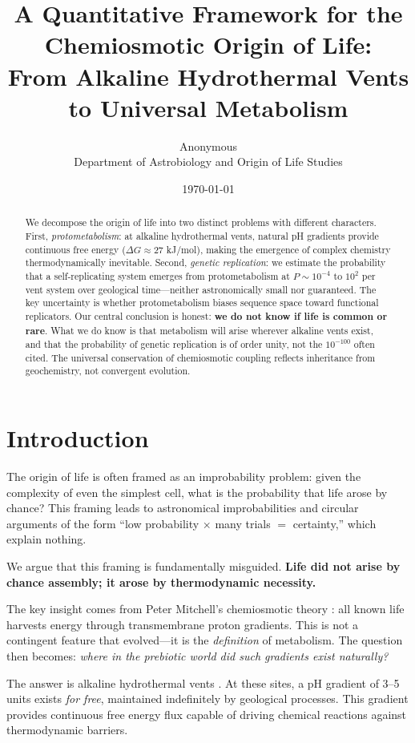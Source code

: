 \documentclass[11pt,twocolumn]{article}
\title{A Quantitative Framework for the Chemiosmotic Origin of Life:\\
From Alkaline Hydrothermal Vents to Universal Metabolism}
\author{Anonymous\\
\small Department of Astrobiology and Origin of Life Studies}
\date{\today}
\begin{document}
\maketitle

\begin{abstract}
We decompose the origin of life into two distinct problems with different characters. First, \textit{protometabolism}: at alkaline hydrothermal vents, natural pH gradients provide continuous free energy ($\Delta G \approx 27$ kJ/mol), making the emergence of complex chemistry thermodynamically inevitable. Second, \textit{genetic replication}: we estimate the probability that a self-replicating system emerges from protometabolism at $P \sim 10^{-4}$ to $10^{2}$ per vent system over geological time—neither astronomically small nor guaranteed. The key uncertainty is whether protometabolism biases sequence space toward functional replicators. Our central conclusion is honest: \textbf{we do not know if life is common or rare}. What we do know is that metabolism will arise wherever alkaline vents exist, and that the probability of genetic replication is of order unity, not the $10^{-100}$ often cited. The universal conservation of chemiosmotic coupling reflects inheritance from geochemistry, not convergent evolution.
\end{abstract}

\section{Introduction}

The origin of life is often framed as an improbability problem: given the complexity of even the simplest cell, what is the probability that life arose by chance? This framing leads to astronomical improbabilities and circular arguments of the form ``low probability $\times$ many trials $=$ certainty,'' which explain nothing.

We argue that this framing is fundamentally misguided. \textbf{Life did not arise by chance assembly; it arose by thermodynamic necessity.}

The key insight comes from Peter Mitchell's chemiosmotic theory \citep{Mitchell1961}: all known life harvests energy through transmembrane proton gradients. This is not a contingent feature that evolved—it is the \textit{definition} of metabolism. The question then becomes: \textit{where in the prebiotic world did such gradients exist naturally?}

The answer is alkaline hydrothermal vents \citep{Russell1994,Lane2010}. At these sites, a pH gradient of 3--5 units exists \textit{for free}, maintained indefinitely by geological processes. This gradient provides continuous free energy flux capable of driving chemical reactions against thermodynamic barriers.
\end{document}
